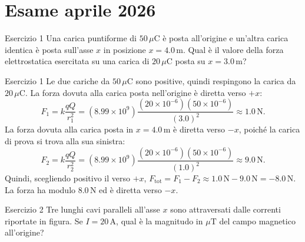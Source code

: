 \documentclass[a4paper]{article}
\begin{document}
\section{Esame aprile 2026}
\begin{snippetexercise}{Esercizio 1}
    Una carica puntiforme di \(50\,\mu\mathrm{C}\) è posta all'origine e
    un'altra carica identica è posta sull'asse \(x\) in posizione
    \(x = 4.0\,\mathrm{m}\). Qual è il valore della forza elettrostatica
    esercitata su una carica di \(20\,\mu\mathrm{C}\) posta su
    \(x = 3.0\,\mathrm{m}\)?
\end{snippetexercise}
\begin{snippetsolution}{Esercizio 1}
    Le due cariche da \(50\,\mu\mathrm{C}\) sono positive, quindi respingono
    la carica da \(20\,\mu\mathrm{C}\).
    La forza dovuta alla carica posta nell'origine è diretta verso \(+x\):
    \[
        F_1 = k \frac{qQ}{r_1^2}
        = \left(8.99 \times 10^9\right)
        \frac{\left(20 \times 10^{-6}\right)
        \left(50 \times 10^{-6}\right)}{(3.0)^2}
        \approx 1.0\,\mathrm{N}.
    \]
    La forza dovuta alla carica posta in \(x = 4.0\,\mathrm{m}\) è diretta
    verso \(-x\), poiché la carica di prova si trova alla sua sinistra:
    \[
        F_2 = k \frac{qQ}{r_2^2}
        = \left(8.99 \times 10^9\right)
        \frac{\left(20 \times 10^{-6}\right)
        \left(50 \times 10^{-6}\right)}{(1.0)^2}
        \approx 9.0\,\mathrm{N}.
    \]
    Quindi, scegliendo positivo il verso \(+x\),
    \(F_{\mathrm{tot}} = F_1 - F_2 \approx 1.0\,\mathrm{N} - 9.0\,\mathrm{N} = -8.0\,\mathrm{N}.\)
    La forza ha modulo
    \(\boxed{8.0\,\mathrm{N}}\)
    ed è diretta verso \(-x\).
\end{snippetsolution}
\begin{snippetexercise}{Esercizio 2}
    Tre lunghi cavi paralleli all'asse \(x\) sono attraversati dalle correnti
    riportate in figura. Se \(I = 20\,\mathrm{A}\), qual è la magnitudo
    in \(\mu\mathrm{T}\) del campo magnetico all'origine?
    \begin{center}
    \end{center}
\end{snippetexercise}
\end{document}
